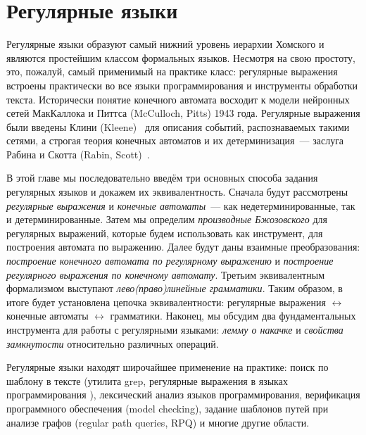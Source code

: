 \setchapterpreamble[u]{\margintoc}
\chapter{Регулярные языки}
\label{chpt:RegularLanguages}

Регулярные языки образуют самый нижний уровень иерархии Хомского и являются простейшим классом формальных языков.
Несмотря на свою простоту, это, пожалуй, самый применимый на практике класс: регулярные выражения встроены практически во все языки программирования и инструменты обработки текста.
Исторически понятие конечного автомата восходит к модели нейронных сетей МакКаллока и Питтса (McCulloch, Pitts) 1943 года.
Регулярные выражения были введены Клини (Kleene)~\cite{Kleene56} для описания событий, распознаваемых такими сетями, а строгая теория конечных автоматов и их детерминизация~--- заслуга Рабина и Скотта (Rabin, Scott)~\cite{10.1147/rd.32.0114}.

В этой главе мы последовательно введём три основных способа задания регулярных языков и докажем их эквивалентность.
Сначала будут рассмотрены \emph{регулярные выражения} и \emph{конечные автоматы}~--- как недетерминированные, так и детерминированные.
Затем мы определим \emph{производные Бжозовского} для регулярных выражений, которые будем использовать как инструмент, для построения автомата по выражению.
Далее будут даны взаимные преобразования: \emph{построение конечного автомата по регулярному выражению} и \emph{построение регулярного выражения по конечному автомату}.
Третьим эквивалентным формализмом выступают \emph{лево(право)линейные грамматики}.
Таким образом, в итоге будет установлена цепочка эквивалентности: регулярные выражения $\leftrightarrow$ конечные автоматы $\leftrightarrow$ грамматики.
Наконец, мы обсудим два фундаментальных инструмента для работы с регулярными языками: \emph{лемму о накачке} и \emph{свойства замкнутости} относительно различных операций.

Регулярные языки находят широчайшее применение на практике: поиск по шаблону в тексте (утилита grep, регулярные выражения в языках программирования%
), лексический анализ языков программирования, верификация программного обеспечения (model checking), задание шаблонов путей при анализе графов (regular path queries, RPQ) и многие другие области.

